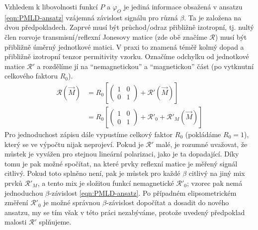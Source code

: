 Vzhledem k libovolnosti funkcí $P$ a $\varphi_O$ je jediná informace obsažená v ansatzu \eqref{eqn:PMLD-ansatz} vzájemná závislost signálu pro různá $\beta$.
Ta je založena na dvou předpokladech.
Zaprvé musí být průchod/odraz přibližně izotropní, tj. nultý člen rozvoje transmisní/reflexní Jonesovy matice (zde obě značíme $\mathcal{R}$) musí být přibližně úměrný jednotkové matici.
V praxi to znamená téměř kolmý dopad a přibližně izotropní tenzor permitivity vzorku.
Označíme odchylku od jednotkové matice $\mathcal{R}'$ a rozdělíme jí na ``nemagnetickou'' a ``magnetickou'' část (po vytknutní celkového faktoru $R_0$).
\begin{align}
\label{eqn:PMLD-Jones}
\mathcal{R}(\vec{M}) &= R_0 \left[ \begin{pmatrix} 1&0\\0&1 \end{pmatrix} + \mathcal{R}'(\vec{M}) \right] \\
                     &= R_0 \left[ \begin{pmatrix} 1&0\\0&1 \end{pmatrix} + \mathcal{R}'_0 + \mathcal{R}'_M(\vec{M}) \right]
\end{align}
Pro jednoduchost zápisu dále vypustíme celkový faktor $R_0$ (pokládáme $R_0=1$), který se ve výpočtu nijak neprojeví.
Pokud je $\mathcal{R}'$ malé, je rozumné uvažovat, že můstek je vyvážen pro stejnou lineární polarizaci, jako je ta dopadající.
Díky tomu je pak možné spočítat, na které prvky reflexní matice je měřený signál citlivý.
Pokud toto splněno není, pak je můstek pro každé $\beta$ citlivý na jiný mix prvků $\mathcal{R}'_M$, a tento mix je složitou funkcí nemagnetické $\mathcal{R}'_0$; vzorec pak nemá jednoduchou $\beta$-závislost \eqref{eqn:PMLD-ansatz}.
Po případném elipsometrickém změření $\mathcal{R}'_0$ je možné správnou $\beta$-závislost dopočítat a dosadit do nového ansatzu, my se tím však v této práci nezabýváme, protože uvedený předpoklad malosti $\mathcal{R}'$ splňujeme.

